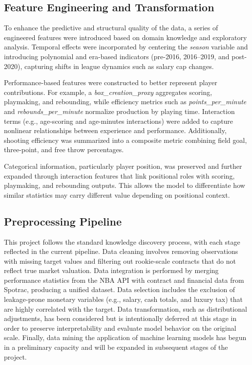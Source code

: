 \documentclass[conference]{IEEEtran}
\begin{document}
\subsection{Feature Engineering and Transformation}

To enhance the predictive and structural quality of the data, a series of engineered features were introduced based on domain knowledge and exploratory analysis. Temporal effects were incorporated by centering the \textit{season} variable and introducing polynomial and era-based indicators (pre-2016, 2016--2019, and post-2020), capturing shifts in league dynamics such as salary cap changes.

Performance-based features were constructed to better represent player contributions. For example, a \textit{box\_creation\_proxy} aggregates scoring, playmaking, and rebounding, while efficiency metrics such as \textit{points\_per\_minute} and \textit{rebounds\_per\_minute} normalize production by playing time. Interaction terms (e.g., age-scoring and age-minutes interactions) were added to capture nonlinear relationships between experience and performance. Additionally, shooting efficiency was summarized into a composite metric combining field goal, three-point, and free throw percentages.

Categorical information, particularly player position, was preserved and further expanded through interaction features that link positional roles with scoring, playmaking, and rebounding outputs. This allows the model to differentiate how similar statistics may carry different value depending on positional context.

\subsection{Preprocessing Pipeline}

This project follows the standard knowledge discovery process, with each stage reflected in the current pipeline. Data cleaning involves removing observations with missing target values and filtering out rookie-scale contracts that do not reflect true market valuation. Data integration is performed by merging performance statistics from the NBA API with contract and financial data from Spotrac, producing a unified dataset. Data selection includes the exclusion of leakage-prone monetary variables (e.g., salary, cash totals, and luxury tax) that are highly correlated with the target. Data transformation, such as distributional adjustments, has been considered but is intentionally deferred at this stage in order to preserve interpretability and evaluate model behavior on the original scale. Finally, data mining the application of machine learning models has begun in a preliminary capacity and will be expanded in subsequent stages of the project.
\end{document}
